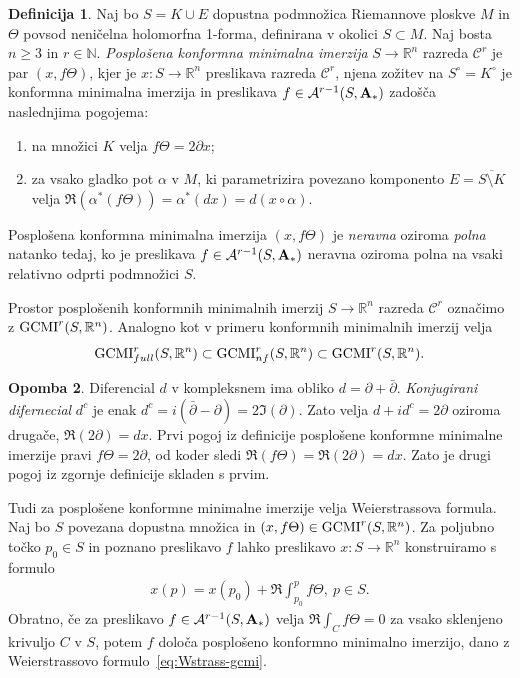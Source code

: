 \documentclass[12pt,a4paper,twoside]{article}
\theoremstyle{definition} %
\newtheorem{definicija}{Definicija}[section]
\newtheorem{opomba}[definicija]{Opomba}
\theoremstyle{plain} %
\numberwithin{equation}{section}  %
\newcommand{\R}{\mathbb R}
\newcommand{\N}{\mathbb N}
\begin{document}
\begin{definicija}
Naj bo $S = K \cup E$ dopustna podmnožica Riemannove ploskve $M$ in $\Theta$ povsod neničelna holomorfna 1-forma, definirana v okolici $S \subset M$.
Naj bosta $n \geq 3$ in $r \in \N$. \emph{Posplošena konformna minimalna imerzija} $S \to \R^{n}$ razreda $\mathcal{C}^{r}$ je par $(x, f \Theta)$, kjer je $x \colon S \to \R^{n}$ preslikava razreda  $\mathcal{C}^{r}$, njena zožitev na $S^\circ = K^\circ$ je konformna minimalna imerzija in preslikava $f \in \mathcal{A}^{r-1}(S, \textbf{\textup{A}}_{*})$ zadošča naslednjima pogojema:
\begin{enumerate}
\item na množici $K$ velja $f \Theta = 2 \partial x$;
\item za vsako gladko pot $\alpha$ v $M$, ki parametrizira povezano komponento $E = \overline{S \setminus K}$ velja $ \Re(\alpha^{*}(f \Theta)) = \alpha^{*}(dx) = d(x \circ \alpha)$.
\end{enumerate}
%
Posplošena konformna minimalna imerzija $(x, f \Theta)$ je \emph{neravna} oziroma \emph{polna} natanko tedaj, ko je preslikava $f \in \mathcal{A}^{r-1}(S, \textbf{\textup{A}}_{*})$ neravna oziroma polna na vsaki relativno odprti podmnožici $S$.
\end{definicija}

Prostor posplošenih konformnih minimalnih imerzij $S \to \R^{n}$ razreda $\mathcal{C}^{r}$ označimo z $\textup{GCMI}^{r}(S, \R^{n})$. Analogno kot v primeru konformnih minimalnih imerzij velja 
\[ \textup{GCMI}_{full}^{r}(S, \R^{n}) \subset \textup{GCMI}_{nf}^{r}(S, \R^{n}) \subset \textup{GCMI}^{r}(S, \R^{n}). \]

\begin{opomba}
Diferencial $d$ v kompleksnem ima obliko $d = \partial + \bar{\partial}$. \emph{Konjugirani difernecial} $d^{c}$ je enak $d^{c} = i(\bar{\partial} - \partial) = 2 \Im(\partial)$. Zato velja $d + i d^{c} = 2 \partial$ oziroma drugače, $\Re(2 \partial) = dx$.
Prvi pogoj iz definicije posplošene konformne minimalne imerzije pravi $f \Theta = 2 \partial$, od koder sledi $\Re(f \Theta) = \Re(2 \partial) = dx$. Zato je drugi pogoj iz zgornje definicije skladen s prvim.
\end{opomba}

Tudi za posplošene konformne minimalne imerzije velja Weierstrassova formula.
Naj bo $S$ povezana dopustna množica in $(x, f \Theta) \in \textup{GCMI}^{r}(S, \R^{n})$. Za poljubno točko $p_{0} \in S$ in poznano preslikavo $f$ lahko preslikavo $x \colon S \to \R^{n}$ konstruiramo s formulo
\begin{align} \label{eq:Wstrass-gcmi}
x(p) = x(p_{0}) + \Re \int_{p_0}^{p} f \Theta, \ p \in S.
\end{align} 
Obratno, če za preslikavo $f \in \mathcal{A}^{r-1}(S, \textbf{\textup{A}}_{*})$ velja $ \Re \int_{C} f \Theta = 0$ za vsako sklenjeno krivuljo $C$ v $S$, potem $f$ določa posplošeno konformno minimalno imerzijo, dano z Weierstrassovo formulo~\ref{eq:Wstrass-gcmi}.
\end{document}
